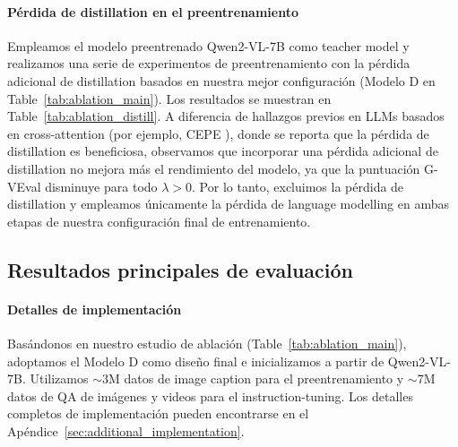 \paragraph{Pérdida de distillation en el preentrenamiento} Empleamos el modelo preentrenado Qwen2-VL-7B como teacher model y realizamos una serie de experimentos de preentrenamiento con la pérdida adicional de distillation basados en nuestra mejor configuración (Modelo D en Table~\ref{tab:ablation_main}). Los resultados se muestran en Table~\ref{tab:ablation_distill}. A diferencia de hallazgos previos en LLMs basados en cross-attention (por ejemplo, CEPE \cite{yen2024long}), donde se reporta que la pérdida de distillation es beneficiosa, observamos que incorporar una pérdida adicional de distillation no mejora más el rendimiento del modelo, ya que la puntuación G-VEval disminuye para todo $\lambda > 0$. Por lo tanto, excluimos la pérdida de distillation y empleamos únicamente la pérdida de language modelling en ambas etapas de nuestra configuración final de entrenamiento.



\subsection{Resultados principales de evaluación}
\label{sec:main_evaluation_results}


\paragraph{Detalles de implementación} Basándonos en nuestro estudio de ablación (Table~\ref{tab:ablation_main}), adoptamos el Modelo D como diseño final e inicializamos \model a partir de Qwen2-VL-7B. Utilizamos $\sim$3M datos de image caption para el preentrenamiento y $\sim$7M datos de QA de imágenes y videos para el instruction-tuning. Los detalles completos de implementación pueden encontrarse en el Apéndice~\ref{sec:additional_implementation}.



\vspace{-1em}
